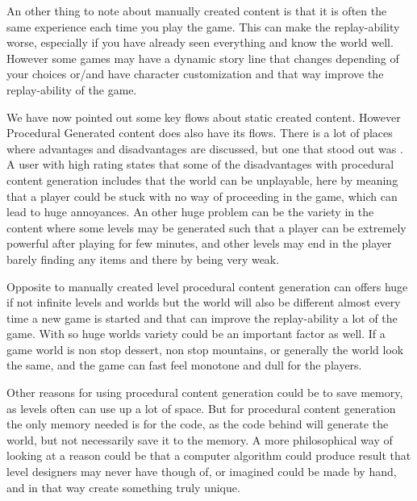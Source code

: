 An other thing to note about manually created content is that it is often the same experience each time you play the game. This can make the replay-ability worse, especially if you have already seen everything and know the world well. However some games may have a dynamic story line that changes depending of your choices or/and have character customization and that way improve the replay-ability of the game.

We have now pointed out some key flows about static created content. However Procedural Generated content does also have its flows. There is a lot of places where advantages and disadvantages are discussed, but one that stood out was \cite{pcgvsmanually}. A user with high rating states that some of the disadvantages with procedural content generation includes that the world can be unplayable, here by meaning that a player could be stuck with no way of proceeding in the game, which can lead to huge annoyances. An other huge problem can be the variety in the content where some levels may be generated such that a player can be extremely powerful after playing for few minutes, and other levels may end in the player barely finding any items and there by being very weak.

Opposite to manually created level procedural content generation can offers huge if not infinite levels and worlds but the world will also be different almost every time a new game is started and that can improve the replay-ability a lot of the game. With so huge worlds variety could be an important factor as well. If a game world is non stop dessert, non stop mountains, or generally the world look the same, and the game can fast feel monotone and dull for the players.

Other reasons for using procedural content generation could be to save memory, as levels often can use up a lot of space. But for procedural content generation the only memory needed is for the code, as the code behind will generate the world, but not necessarily save it to the memory. A more philosophical way of looking at a reason could be that a computer algorithm could produce result that level designers may never have though of, or imagined could be made by hand, and in that way create something truly unique.